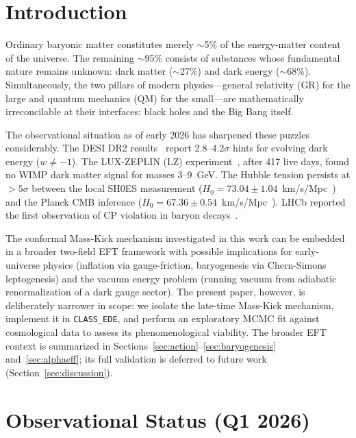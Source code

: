 \documentclass[a4paper,11pt]{article}
\begin{document}
\newpage
\tableofcontents
\newpage

\section{Introduction}
\label{sec:intro}

Ordinary baryonic matter constitutes merely $\sim$5\% of the energy-matter content of the universe. The remaining $\sim$95\% consists of substances whose fundamental nature remains unknown: dark matter ($\sim$27\%) and dark energy ($\sim$68\%). Simultaneously, the two pillars of modern physics---general relativity (GR) for the large and quantum mechanics (QM) for the small---are mathematically irreconcilable at their interfaces: black holes and the Big Bang itself.

The observational situation as of early 2026 has sharpened these puzzles considerably. The DESI DR2 results~\cite{DESI2025} report 2.8--4.2$\sigma$ hints for evolving dark energy ($w \neq -1$). The LUX-ZEPLIN (LZ) experiment~\cite{LZ2025}, after 417 live days, found no WIMP dark matter signal for masses 3--9~GeV. The Hubble tension persists at $>5\sigma$ between the local SH0ES measurement ($H_0 = 73.04 \pm 1.04$~km/s/Mpc~\cite{Riess2022}) and the Planck CMB inference ($H_0 = 67.36 \pm 0.54$~km/s/Mpc~\cite{Planck2018}). LHCb reported the first observation of CP violation in baryon decays~\cite{LHCb2025}.

The conformal Mass-Kick mechanism investigated in this work can be embedded in a broader two-field EFT framework with possible implications for early-universe physics (inflation via gauge-friction, baryogenesis via Chern-Simons leptogenesis) and the vacuum energy problem (running vacuum from adiabatic renormalization of a dark gauge sector). The present paper, however, is deliberately narrower in scope: we isolate the late-time Mass-Kick mechanism, implement it in \texttt{CLASS\_EDE}, and perform an exploratory MCMC fit against cosmological data to assess its phenomenological viability. The broader EFT context is summarized in Sections~\ref{sec:action}--\ref{sec:baryogenesis} and~\ref{sec:alphaeff}; its full validation is deferred to future work (Section~\ref{sec:discussion}).


\section{Observational Status (Q1 2026)}
\label{sec:observations}
\end{document}

